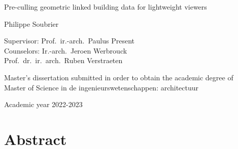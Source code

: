 \begin{center}
    \sffamily
    \huge Pre-culling geometric linked building data
    for lightweight viewers
    
    \Large Philippe Soubrier

    \normalsize
    Supervisor: Prof.\ ir.-arch.\ Paulus Present         \\
    Counselors: Ir.-arch.\ Jeroen Werbrouck \\
    Prof.\ dr.\ ir.\ arch.\ Ruben Verstraeten
\end{center}

Master’s dissertation submitted in order to obtain the academic degree of \\
Master of Science in de ingenieurswetenschappen: architectuur

Academic year 2022-2023
\section*{\LARGE Abstract}
\lipsum[1-2]